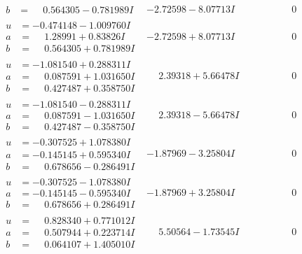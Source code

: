 \documentclass[1p]{elsarticle_modified}
\theoremstyle{definition}
\begin{document}
$$\begin{array}{c|c|c}
\begin{aligned}
b &= \phantom{-}0.564305 - 0.781989 I\end{aligned}
 & -2.72598 - 8.07713 I & \phantom{-0.000000 } 0 \\ \hline\begin{aligned}
u &= -0.474148 - 1.009760 I \\
a &= \phantom{-}1.28991 + 0.83826 I \\
b &= \phantom{-}0.564305 + 0.781989 I\end{aligned}
 & -2.72598 + 8.07713 I & \phantom{-0.000000 } 0 \\ \hline\begin{aligned}
u &= -1.081540 + 0.288311 I \\
a &= \phantom{-}0.087591 + 1.031650 I \\
b &= \phantom{-}0.427487 + 0.358750 I\end{aligned}
 & \phantom{-}2.39318 + 5.66478 I & \phantom{-0.000000 } 0 \\ \hline\begin{aligned}
u &= -1.081540 - 0.288311 I \\
a &= \phantom{-}0.087591 - 1.031650 I \\
b &= \phantom{-}0.427487 - 0.358750 I\end{aligned}
 & \phantom{-}2.39318 - 5.66478 I & \phantom{-0.000000 } 0 \\ \hline\begin{aligned}
u &= -0.307525 + 1.078380 I \\
a &= -0.145145 + 0.595340 I \\
b &= \phantom{-}0.678656 - 0.286491 I\end{aligned}
 & -1.87969 - 3.25804 I & \phantom{-0.000000 } 0 \\ \hline\begin{aligned}
u &= -0.307525 - 1.078380 I \\
a &= -0.145145 - 0.595340 I \\
b &= \phantom{-}0.678656 + 0.286491 I\end{aligned}
 & -1.87969 + 3.25804 I & \phantom{-0.000000 } 0 \\ \hline\begin{aligned}
u &= \phantom{-}0.828340 + 0.771012 I \\
a &= \phantom{-}0.507944 + 0.223714 I \\
b &= \phantom{-}0.064107 + 1.405010 I\end{aligned}
 & \phantom{-}5.50564 - 1.73545 I & \phantom{-0.000000 } 0 \\ \hline\begin{aligned}

\end{aligned}
\end{array}$$
\end{document}
